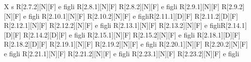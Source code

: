 \begin{longtable}{X s}
		R[2.7.2][N][F] e figli \newline R[2.8.1][N][F] \newline R[2.8.2][N][F] e figli \newline 
		R[2.9.1][N][F] \newline R[2.9.2][N][F] e figli \newline R[2.10.1][N][F] \newline 
		R[2.10.2][N][F] e figli\newline R[2.11.1][D][F] \newline R[2.11.2][D][F] \newline
		R[2.12.1][N][F] \newline R[2.12.2][N][F] e figli \newline R[2.13.1][N][F] \newline
		R[2.13.2][N][F] e figli\newline R[2.14.1][D][F] \newline R[2.14.2][D][F] e figli \newline
		R[2.15.1][N][F] \newline R[2.15.2][N][F] e figli \newline R[2.18.1][D][F] \newline
		R[2.18.2][D][F] \newline R[2.19.1][N][F] \newline R[2.19.2][N][F] e figli \newline
		R[2.20.1][N][F] \newline R[2.20.2][N][F] e figli \newline R[2.21.1][N][F] \newline
		R[2.21.2][N][F] e figli \newline R[2.23.1][N][F] \newline R[2.23.2][N][F] e figli
	\\
	\hline
	
\bottomrule
\caption{Componenti-Requisiti}
\end{longtable}   